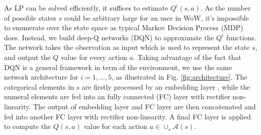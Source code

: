 \documentclass{sigchi}
\begin{document}
As LP can be solved efficiently, it suffices to estimate $Q^i(s,a)$.
As the number of possible states $s$ could be arbitrary large for an user in WoW, it's impossible to enumerate over the state space as typical Markov Decision Process (MDP) does.
Instead, we build deep-Q networks (DQN) \cite{mnih2015human} to approximate the $Q^i$ functions.
The network takes the observation as input which is used to represent the state $s$, and output the $Q$ value for every action $a$.
Taking advantage of the fact that DQN is a general framework in term of the environment, we use the same network architecture for $i=1,\dots,5$, as illustrated in Fig. \ref{fig:architecture}. 
The categorical elements in $s$ are firstly processed by an embedding layer \cite{mikolov2013distributed}, while the numeral elements are fed into an fully connected (FC) layer with rectifier non-linearity. 
The output of embedding layer and FC layer are then concatenated and fed into another FC layer with rectifier non-linearity. 
A final FC layer is applied to compute the $Q(s,a)$ value for each action $a\in\cup_s\mathcal{A}(s)$.
\end{document}
